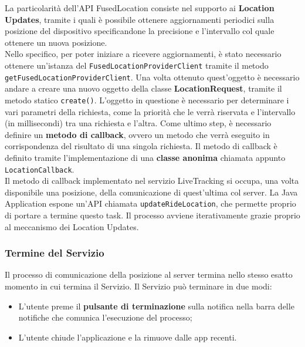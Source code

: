                         La particolarità dell'API FusedLocation consiste nel supporto ai \textbf{Location Updates}, tramite i quali è possibile ottenere aggiornamenti periodici sulla posizione del dispositivo specificandone la precisione e l'intervallo col quale ottenere un nuova posizione. \\
                        Nello specifico, per poter iniziare a ricevere aggiornamenti, è stato necessario ottenere un'istanza del \texttt{FusedLocationProviderClient} tramite il metodo \\ \texttt{getFusedLocationProviderClient}.
                        Una volta ottenuto quest'oggetto è necessario andare a creare una nuovo oggetto della classe \textbf{LocationRequest}, tramite il metodo statico \texttt{create()}. L'oggetto in questione è necessario per determinare i vari parametri della richiesta, come la priorità che le verrà riservata e l'intervallo (in millisecondi) tra una richiesta e l'altra.
                        Come ultimo step, è necessario definire un \textbf{metodo di callback}, ovvero un metodo che verrà eseguito in corrispondenza del risultato di una singola richiesta. Il metodo di callback è definito tramite l'implementazione di una \textbf{classe anonima} chiamata appunto \texttt{LocationCallback}.\\
                        Il metodo di callback implementato nel servizio LiveTracking si occupa, una volta disponibile una posizione, della comunicazione di quest'ultima col server. 
                        La Java Application espone un'API chiamata \texttt{updateRideLocation}, che permette proprio di portare a termine questo task.
                        Il processo avviene iterativamente grazie proprio al meccanismo dei Location Updates. 
                        
                        \newpage
                        
                        \subsubsection{Termine del Servizio}
                            Il processo di comunicazione della posizione al server termina nello stesso esatto momento in cui termina il Servizio.
                            Il Servizio può terminare in due modi:

                            \begin{itemize}
                                \item L'utente preme il \textbf{pulsante di terminazione} sulla notifica nella barra delle notifiche che comunica l'esecuzione del processo;
                                \item L'utente chiude l'applicazione e la rimuove dalle app recenti.
                            \end{itemize}

